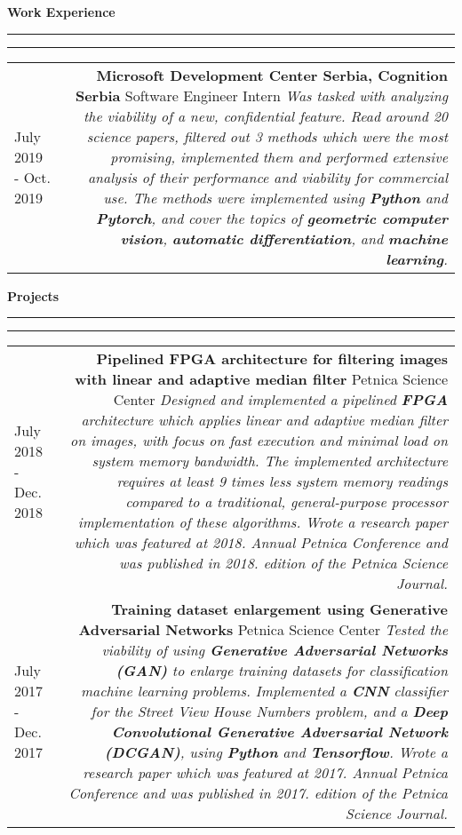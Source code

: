 \documentclass{article}
\newcommand{\mainitem}[3] {
    \textbf{#1}  \newline #2 \vskip5pt  \textit{#3} 
    \vspace{6pt}    %
}
\newenvironment{cvtable} {
	\hspace{-20pt} \begin{tabular}{L!{\color{line_color}\vrule width 1pt}D} %
} 
{\end{tabular}}
\renewcommand{\section}[1] {
    \vspace{15pt}   %
	{\color{main_color} \Large \textbf {#1}}
	{\color{line_color} \vskip-5pt \rule{\linewidth}{0.5mm}\hfill\vskip-11pt\rule{\linewidth}{0.2pt}}
	\vskip10pt  %
}
\begin{document}
    
    \section{Work Experience}
    	\begin{cvtable}
    	    \hspace{5pt} July 2019 - Oct. 2019  & 
    			\mainitem
    			    {Microsoft Development Center Serbia, Cognition Serbia}
    				{Software Engineer Intern} {
    				    Was tasked with analyzing the viability of a new, confidential feature.
    					Read around 20 science papers, filtered out 3 methods which were the most promising, implemented them and performed extensive analysis of their performance and viability for commercial use. The methods were implemented using \textbf{Python} and \textbf{Pytorch}, and cover the topics of \textbf{geometric computer vision}, \textbf{automatic differentiation}, and \textbf{machine learning}.
    				}
    	\end{cvtable}
    
    \section{Projects}
    	\begin{cvtable}
    	    \hspace{5pt} July 2018 - Dec. 2018 & 
    			\mainitem
    			    {Pipelined FPGA architecture for filtering images with linear and adaptive median filter}
    			    {Petnica Science Center} 
    			    {
    			        Designed and implemented a pipelined \textbf{FPGA} architecture which applies linear and adaptive median filter on images, with focus on fast execution and minimal load on system memory bandwidth. The implemented architecture requires at least 9 times less system memory readings compared to a traditional, general-purpose processor implementation of these algorithms. Wrote a research paper which was featured at 2018. Annual Petnica Conference and was published in 2018. edition of the Petnica Science Journal.
                    } 
    	    \\
    		\hspace{5pt} July 2017 - Dec. 2017 & 
    			\mainitem
    			    {Training dataset enlargement using Generative Adversarial Networks}
    			    {Petnica Science Center} 
    			    {
    			        Tested the viability of using \textbf{Generative Adversarial Networks (GAN)} to enlarge training datasets for classification machine learning problems. Implemented a \textbf{CNN} classifier for the Street View House Numbers problem, and a \textbf{Deep Convolutional Generative Adversarial Network (DCGAN)}, using \textbf{Python} and \textbf{Tensorflow}. Wrote a research paper which was featured at 2017. Annual Petnica Conference and was published in 2017. edition of the Petnica Science Journal.
                    }
    	\end{cvtable}
    	
\end{document}
